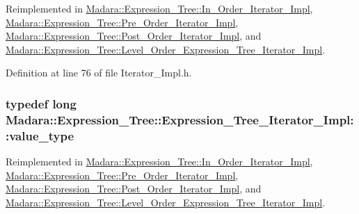 Reimplemented in \hyperlink{classMadara_1_1Expression__Tree_1_1In__Order__Iterator__Impl_a5c0f0d09ddd61423f4d11acedecd5b2f}{Madara::Expression\_\-Tree::In\_\-Order\_\-Iterator\_\-Impl}, \hyperlink{classMadara_1_1Expression__Tree_1_1Pre__Order__Iterator__Impl_a5cc08adff5382552f5af26d092559270}{Madara::Expression\_\-Tree::Pre\_\-Order\_\-Iterator\_\-Impl}, \hyperlink{classMadara_1_1Expression__Tree_1_1Post__Order__Iterator__Impl_abcfe99c7ecb45d8400b7a6a91b47827b}{Madara::Expression\_\-Tree::Post\_\-Order\_\-Iterator\_\-Impl}, and \hyperlink{classMadara_1_1Expression__Tree_1_1Level__Order__Expression__Tree__Iterator__Impl_a6aff68baa7a2f6732ffd795bd08379b6}{Madara::Expression\_\-Tree::Level\_\-Order\_\-Expression\_\-Tree\_\-Iterator\_\-Impl}.



Definition at line 76 of file Iterator\_\-Impl.h.

\hypertarget{classMadara_1_1Expression__Tree_1_1Expression__Tree__Iterator__Impl_a7905c3a8d6cb961d826aff8bbd10e520}{
\subsubsection[{value\_\-type}]{\setlength{\rightskip}{0pt plus 5cm}typedef long {\bf Madara::Expression\_\-Tree::Expression\_\-Tree\_\-Iterator\_\-Impl::value\_\-type}}}
\label{d0/dd7/classMadara_1_1Expression__Tree_1_1Expression__Tree__Iterator__Impl_a7905c3a8d6cb961d826aff8bbd10e520}


Reimplemented in \hyperlink{classMadara_1_1Expression__Tree_1_1In__Order__Iterator__Impl_a65c282508964c2ed09aef99fca7aa057}{Madara::Expression\_\-Tree::In\_\-Order\_\-Iterator\_\-Impl}, \hyperlink{classMadara_1_1Expression__Tree_1_1Pre__Order__Iterator__Impl_a358d7155f2c4d3447a47afb9852a0a4d}{Madara::Expression\_\-Tree::Pre\_\-Order\_\-Iterator\_\-Impl}, \hyperlink{classMadara_1_1Expression__Tree_1_1Post__Order__Iterator__Impl_a1cbf1023180bd2e240f068a7ae890c3b}{Madara::Expression\_\-Tree::Post\_\-Order\_\-Iterator\_\-Impl}, and \hyperlink{classMadara_1_1Expression__Tree_1_1Level__Order__Expression__Tree__Iterator__Impl_a8c7971c6809cb6ed6070d38da663bb45}{Madara::Expression\_\-Tree::Level\_\-Order\_\-Expression\_\-Tree\_\-Iterator\_\-Impl}.



